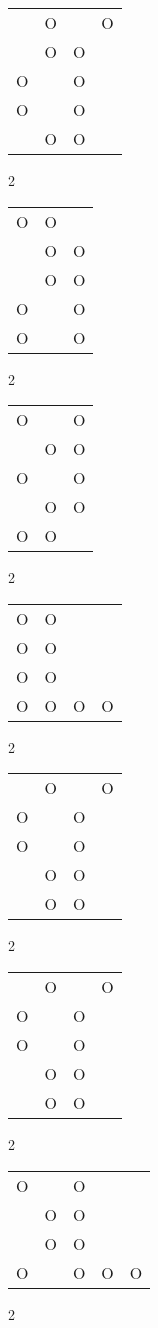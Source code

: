 \begin{tabular}{|m{0.2cm}m{0.2cm}m{0.2cm}m{0.2cm}|}\hline
 &O& &O\\
 &O&O& \\
O& &O& \\
O& &O& \\
 &O&O& \\
\hline\end{tabular}2
\begin{tabular}{|m{0.2cm}m{0.2cm}m{0.2cm}|}\hline
O&O& \\
 &O&O\\
 &O&O\\
O& &O\\
O& &O\\
\hline\end{tabular}2
\begin{tabular}{|m{0.2cm}m{0.2cm}m{0.2cm}|}\hline
O& &O\\
 &O&O\\
O& &O\\
 &O&O\\
O&O& \\
\hline\end{tabular}2
\begin{tabular}{|m{0.2cm}m{0.2cm}m{0.2cm}m{0.2cm}|}\hline
O&O& & \\
O&O& & \\
O&O& & \\
O&O&O&O\\
\hline\end{tabular}2
\begin{tabular}{|m{0.2cm}m{0.2cm}m{0.2cm}m{0.2cm}|}\hline
 &O& &O\\
O& &O& \\
O& &O& \\
 &O&O& \\
 &O&O& \\
\hline\end{tabular}2
\begin{tabular}{|m{0.2cm}m{0.2cm}m{0.2cm}m{0.2cm}|}\hline
 &O& &O\\
O& &O& \\
O& &O& \\
 &O&O& \\
 &O&O& \\
\hline\end{tabular}2
\begin{tabular}{|m{0.2cm}m{0.2cm}m{0.2cm}m{0.2cm}m{0.2cm}|}\hline
O& &O& & \\
 &O&O& & \\
 &O&O& & \\
O& &O&O&O\\
\hline\end{tabular}2
